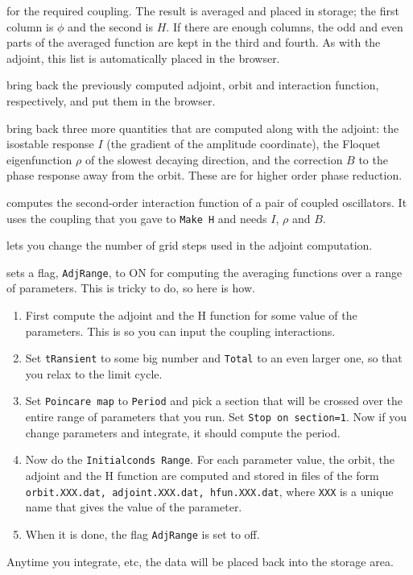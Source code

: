 \documentclass{article}
\begin{document}
\begin{description}
\begin{description}
for the required coupling.  The result is averaged and placed in storage; the first column is $\phi$ and the second is $H$.
If there are enough columns, the odd and even parts of the averaged function are kept in the third and fourth.  As with the adjoint, this list
is automatically placed in the browser.
\item[(A)djoint, (O)rbit, (H)fun] bring back the previously computed adjoint, orbit and interaction function, respectively,
and put them in the browser.
\item[(I)sostable, (F)loquet rho, (B)correction] bring back three more quantities that are computed along with the adjoint:
the isostable response $I$ (the gradient of the amplitude coordinate), the Floquet eigenfunction $\rho$ of the slowest decaying direction, and
the correction $B$ to the phase response away from the orbit.  These are for higher order phase reduction.
\item[(2) H2] computes the second-order interaction function of a pair of coupled oscillators.  It uses the coupling that you gave
to {\tt Make H} and needs $I$, $\rho$ and $B$.
\item[(P)arameters] lets you change the number of grid steps used in the adjoint computation.
\item[(R)ange] sets a flag, {\tt AdjRange}, to ON for computing the averaging functions over a range of parameters.  This is tricky to do,
so here is how.
\begin{enumerate}
\item First compute the adjoint and the H function for some value of the parameters.  This is so you can input the coupling interactions.
\item Set {\tt tRansient} to some big number and {\tt Total} to an even larger one, so that you relax to the limit cycle.
\item Set {\tt Poincare map} to {\tt Period} and pick a section that will be crossed over the entire range of parameters that you run.  Set
{\tt Stop on section=1}.  Now if you change parameters and integrate, it should compute the period.
\item Now do the {\tt Initialconds Range}.  For each parameter value, the orbit, the adjoint and the H function are computed and stored in
files of the form {\tt orbit.XXX.dat, adjoint.XXX.dat, hfun.XXX.dat}, where {\tt XXX} is a unique name that gives the value of the parameter.
\item When it is done, the flag {\tt AdjRange} is set to off.
\end{enumerate}
\end{description}
Anytime you integrate, etc, the data will be placed back into the storage area.
\end{description}
\end{document}
